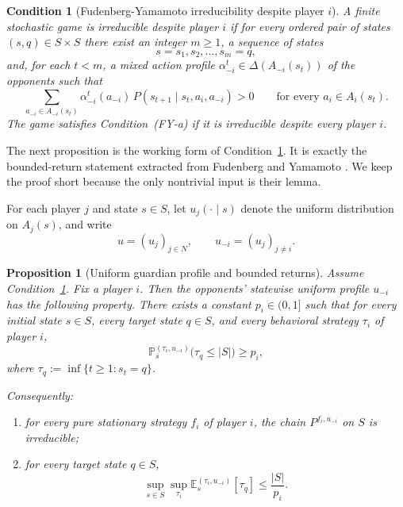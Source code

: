 \documentclass[11pt]{article}
\newtheorem{proposition}[theorem]{Proposition}
\newtheorem{condition}[theorem]{Condition}
\theoremstyle{definition}
\newcommand{\E}{\mathbb{E}}
\newcommand{\Prob}{\mathbb{P}}
\newcommand{\1}{\mathbf{1}}
\begin{document}
\begin{condition}[Fudenberg-Yamamoto irreducibility despite player $i$]\label{cond:FY}
A finite stochastic game is \emph{irreducible despite player $i$} if for every ordered pair of states $(s,q)\in S\times S$ there exist an integer $m\ge1$, a sequence of states
\[
s=s_1,s_2,\dots,s_m=q,
\]
and, for each $t<m$, a mixed action profile $\alpha_{-i}^t\in \Delta(A_{-i}(s_t))$ of the opponents such that
\[
\sum_{a_{-i}\in A_{-i}(s_t)}\alpha_{-i}^t(a_{-i})\,P(s_{t+1}\mid s_t,a_i,a_{-i})>0
\qquad\text{for every }a_i\in A_i(s_t).
\]
The game satisfies \emph{Condition~(FY-a)} if it is irreducible despite every player $i$.
\end{condition}

The next proposition is the working form of Condition~\ref{cond:FY}. It is exactly the bounded-return statement extracted from Fudenberg and Yamamoto \cite[Lemma~1]{FudenbergYamamoto2011}. We keep the proof short because the only nontrivial input is their lemma.

For each player $j$ and state $s\in S$, let $u_j(\cdot\mid s)$ denote the uniform distribution on $A_j(s)$, and write
\[
u=(u_j)_{j\in N},\qquad u_{-i}=(u_j)_{j\neq i}.
\]

\begin{proposition}[Uniform guardian profile and bounded returns]\label{prop:guardian}
Assume Condition~\ref{cond:FY}. Fix a player $i$. Then the opponents' statewise uniform profile $u_{-i}$ has the following property. There exists a constant $p_i\in(0,1]$ such that for every initial state $s\in S$, every target state $q\in S$, and every behavioral strategy $\tau_i$ of player $i$,
\begin{equation}\label{eq:guardian-prob}
\Prob_s^{(\tau_i,u_{-i})}\!\bigl(\tau_q\le |S|\bigr)\ge p_i,
\end{equation}
where $\tau_q:=\inf\{t\ge1:s_t=q\}$.

Consequently:
\begin{enumerate}[label=\textup{(\alph*)},leftmargin=2.5em]
\item for every pure stationary strategy $f_i$ of player $i$, the chain $P^{f_i,u_{-i}}$ on $S$ is irreducible;
\item for every target state $q\in S$,
\begin{equation}\label{eq:guardian-mean}
\sup_{s\in S}\sup_{\tau_i}\E_s^{(\tau_i,u_{-i})}[\tau_q]\le \frac{|S|}{p_i}.
\end{equation}
\end{enumerate}
\end{proposition}
\end{document}

